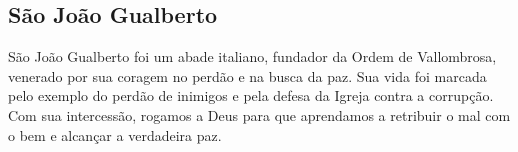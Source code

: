 \documentclass[18pt]{letter}
\author{Adaptado de publicação revisada}
\begin{document}
\tableofcontents

\thispagestyle{empty}
\pagestyle{fancy}
\fancyhf{}
\fancyfoot[R]{\thepage}

\centering

\vfill


\newpage

\begin{justify}
  \begin{center}
    \section{São João Gualberto}
  \end{center}

São João Gualberto foi um abade italiano, fundador da Ordem de Vallombrosa, venerado por sua coragem no perdão e na busca da paz. Sua vida foi marcada pelo exemplo do perdão de inimigos e pela defesa da Igreja contra a corrupção. Com sua intercessão, rogamos a Deus para que aprendamos a retribuir o mal com o bem e alcançar a verdadeira paz.

\end{justify}
\end{document}
